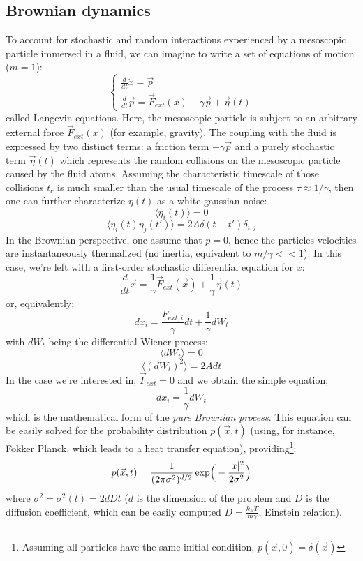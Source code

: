 \subsection{Brownian dynamics}
To account for stochastic and random interactions experienced by a mesoscopic particle immersed in a fluid, we can imagine to write a set of equations of motion ($m = 1$):
\begin{equation}
	\begin{cases}
		\frac{d}{dt}\dot x = \vec p \\
		\frac{d}{dt} \vec p = \vec F_{ext}(x) - \gamma \vec p + \vec \eta(t)
	\end{cases}
	\label{eq:langevin}
\end{equation}
called Langevin equations. Here, the mesoscopic particle is subject to an arbitrary external force $\vec F_{ext}(x)$ (for example, gravity). The coupling with the fluid is expressed by two distinct terms: a friction term $-\gamma \vec p$ and a purely stochastic term $\vec \eta(t)$ which represents the random collisions on the mesoscopic particle caused by the fluid atoms. Assuming the characteristic timescale of those collisions $t_c$ is much smaller than the usual timescale of the process $\tau \approx 1/\gamma$, then one can further characterize $\eta(t)$ as a white gaussian noise:
$$
\langle \eta_i(t) \rangle = 0
$$
$$
\langle \eta_i(t)\eta_j(t') \rangle = 2A\delta(t-t')\delta_{i,j}
$$
In the Brownian perspective, one assume that $\dot p=0$, hence the particles velocities are instantaneously thermalized (no inertia, equivalent to $m / \gamma << 1$). In this case, we're left with a first-order stochastic differential equation for $x$:
\begin{equation}
	\frac{d}{dt} \vec x = \frac{1}{\gamma} \vec F_{ext}(\vec x) + \frac{1}{\gamma}\vec \eta(t)
\end{equation}
or, equivalently:
\begin{equation}
	d x_i = \frac{F_{ext,i}}{\gamma}dt + \frac{1}{\gamma} dW_t
\end{equation}
with $dW_t$ being the differential Wiener process:
$$
\langle dW_t \rangle = 0
$$
$$
\langle (dW_t)^2 \rangle = 2A dt
$$
In the case we're interested in, $\vec F_{ext} = 0$ and we obtain the simple equation;
\begin{equation}
	dx_i = \frac{1}{\gamma} dW_t
\end{equation}
which is the mathematical form of the \textit{pure Brownian process}. This equation can be easily solved for the probability distribution $p(\vec x,t)$ (using, for instance, Fokker Planck, which leads to a heat transfer equation), providing\footnote{Assuming all particles have the same initial condition, $p(\vec x, 0) = \delta(\vec x)$}:
\begin{equation}
	p(\vec x,t) = \frac{1}{(2\pi\sigma^2)^{d/2}}\exp\Bigr(-\frac{|x|^2}{2\sigma^2}\Bigl)
\end{equation}
where $\sigma^2 = \sigma^2(t) = 2 d D t$ ($d$ is the dimension of the problem and $D$ is the diffusion coefficient, which can be easily computed $D = \frac{k_B T}{m\gamma}$, Einstein relation).

